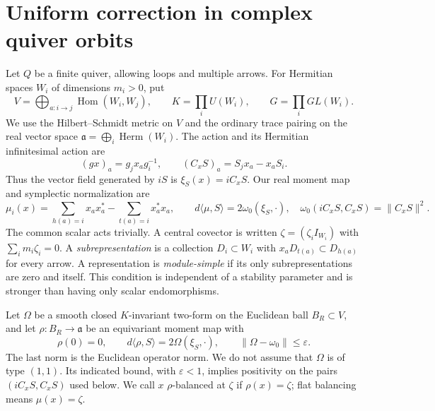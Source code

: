 \section{Uniform correction in complex quiver orbits}\label{sec:balancing}

Let $Q$ be a finite quiver, allowing loops and multiple arrows.
For Hermitian spaces $W_i$ of dimensions $m_i>0$, put
\[
 V=\bigoplus_{a:i\to j}\operatorname{Hom}(W_i,W_j),\qquad
 K=\prod_iU(W_i),\qquad G=\prod_iGL(W_i).
\]
We use the Hilbert--Schmidt metric on $V$ and the ordinary trace pairing
on the real vector space $\mathfrak a=\bigoplus_i\operatorname{Herm}(W_i)$.
The action and its Hermitian infinitesimal action are
\[
 (g x)_a=g_jx_ag_i^{-1},\qquad (C_xS)_a=S_jx_a-x_aS_i.
\]
Thus the vector field generated by $iS$ is $\xi_S(x)=iC_xS$.
Our real moment map and symplectic normalization are
\begin{equation}\label{eq:moment-normalization}
 \mu_i(x)=\sum_{h(a)=i}x_ax_a^*-\sum_{t(a)=i}x_a^*x_a,
 \qquad
 d\langle\mu,S\rangle=2\omega_0(\xi_S,\cdot),
 \quad \omega_0(iC_xS,C_xS)=\|C_xS\|^2.
\end{equation}
The common scalar acts trivially. A central covector is written
$\zeta=(\zeta_i I_{W_i})$ with $\sum_i m_i\zeta_i=0$.
A \emph{subrepresentation} is a collection $D_i\subset W_i$ with
$x_aD_{t(a)}\subset D_{h(a)}$ for every arrow.
A representation is \emph{module-simple} if its only
subrepresentations are zero and itself. This condition is independent
of a stability parameter and is stronger than having only scalar
endomorphisms.

Let $\Omega$ be a smooth closed $K$-invariant two-form on the Euclidean
ball $B_R\subset V$, and let $\rho:B_R\to\mathfrak a$ be an equivariant
moment map with
\begin{equation}\label{eq:perturbed-moment}
 \rho(0)=0,\qquad
 d\langle\rho,S\rangle=2\Omega(\xi_S,\cdot),\qquad
 \|\Omega-\omega_0\|\le\varepsilon.
\end{equation}
The last norm is the Euclidean operator norm. We do not assume that
$\Omega$ is of type $(1,1)$. Its indicated bound, with $\varepsilon<1$,
implies positivity on the pairs $(iC_xS,C_xS)$ used below.
We call $x$ $\rho$-balanced at $\zeta$ if $\rho(x)=\zeta$;
flat balancing means $\mu(x)=\zeta$.

